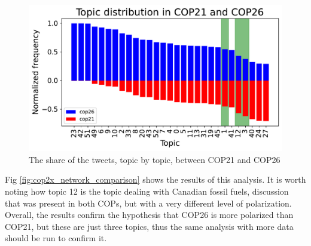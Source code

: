 \begin{figure}[H]
    \centering
    \includegraphics[width=0.9\linewidth]{Chapter5/figures/2x_topic_distribution.pdf}
    \caption{The share of the tweets, topic by topic, between COP21 and COP26 }
    \label{fig:2126_share}
\end{figure}

Fig \ref{fig:cop2x_network_comparison}  shows the results of this analysis. It is worth noting how topic 12 is the topic dealing with Canadian fossil fuels, discussion that was present in both COPs, but with a very different level of polarization. Overall, the results confirm the hypothesis that COP26 is more polarized than COP21, but these are just three topics, thus the same analysis with more data should be run to confirm it.

